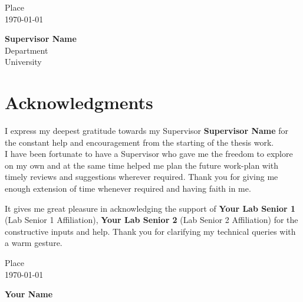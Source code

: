 \documentclass[11pt,a4paper]{report}\usepackage[]{graphicx}\usepackage[]{color}
\newcommand{\Name}{Your Name}
\newcommand{\Supervisor}{Supervisor Name} %
\newcommand{\Department}{Department}
\newcommand{\University}{University}
\newcommand{\Place}{Place}
\newcommand{\ThanksOne}{Your Lab Senior 1}
\newcommand{\ThanksOneAffil}{Lab Senior 1 Affiliation} %
\newcommand{\ThanksTwo}{Your Lab Senior 2}
\newcommand{\ThanksTwoAffil}{Lab Senior 2 Affiliation}
\begin{document}
\begin{flushleft}
\Place\\
\today
\end{flushleft}


\begin{flushright}
\textbf{\Supervisor}\\
\Department\\
\University
\end{flushright}
\thispagestyle{empty}
\pagebreak



\chapter*{\centering Acknowledgments}

I express my deepest gratitude towards my Supervisor \textbf{\Supervisor} for the constant help and encouragement from the starting of the thesis work.\\
I have been fortunate to have a Supervisor who gave me the freedom to explore on my own and at the same time helped me plan the future work-plan with timely reviews and suggestions wherever required. Thank you for giving me enough extension of time whenever required and having faith in me.

It gives me great pleasure in acknowledging the support of \textbf{\ThanksOne} (\ThanksOneAffil), \textbf{\ThanksTwo} (\ThanksTwoAffil) for the constructive inputs and help. Thank you for clarifying my technical queries with a warm gesture.
\vspace{18pt}

\begin{flushleft}
\Place\\
\today
\end{flushleft}

\begin{flushright}
\textbf{\Name}\\
\end{flushright}


\thispagestyle{empty}
\pagebreak



\tableofcontents
\thispagestyle{empty}
\pagebreak

\listoftables
\thispagestyle{empty}
\pagebreak
\end{document}
